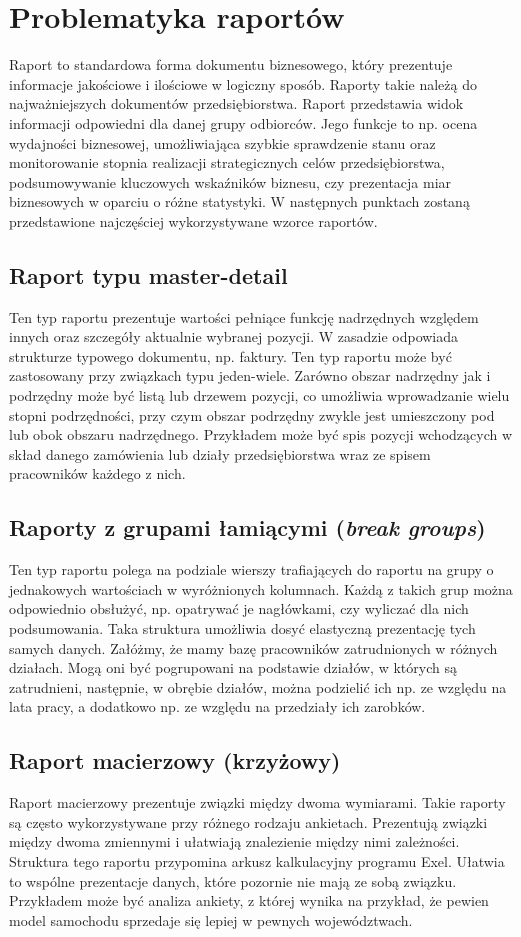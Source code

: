 \documentclass[11pt,a4paper]{article}
\begin{document}
\section{Problematyka raportów}\label{sec:raport}
Raport to standardowa forma dokumentu biznesowego, który prezentuje informacje jakościowe i ilościowe w logiczny sposób. Raporty takie należą do najważniejszych dokumentów przedsiębiorstwa. Raport przedstawia widok informacji odpowiedni dla danej grupy odbiorców. Jego funkcje to np.
ocena wydajności biznesowej, umożliwiająca szybkie sprawdzenie stanu oraz monitorowanie stopnia realizacji strategicznych celów przedsiębiorstwa, podsumowywanie kluczowych wskaźników biznesu, czy prezentacja miar biznesowych w oparciu o różne statystyki. W następnych punktach zostaną przedstawione najczęściej wykorzystywane wzorce raportów.
\subsection{Raport typu master-detail}\label{sec:master_detail}
Ten typ raportu prezentuje wartości pełniące funkcję nadrzędnych względem innych oraz szczegóły aktualnie wybranej pozycji. W zasadzie odpowiada strukturze typowego dokumentu, np. faktury. Ten typ raportu może być zastosowany przy związkach typu jeden-wiele. Zarówno obszar nadrzędny jak i podrzędny może być listą lub drzewem pozycji, co umożliwia wprowadzanie wielu stopni podrzędności, przy czym obszar podrzędny zwykle jest umieszczony pod lub obok obszaru nadrzędnego. Przykładem może być spis pozycji wchodzących w skład danego zamówienia lub działy przedsiębiorstwa wraz ze spisem pracowników każdego z nich.
\subsection{Raporty z grupami łamiącymi (\emph{break groups})}\label{sec:break_groups}
Ten typ raportu polega na podziale wierszy trafiających do raportu na grupy o jednakowych wartościach w wyróżnionych kolumnach. Każdą z takich grup można odpowiednio obsłużyć, np. opatrywać je nagłówkami, czy wyliczać dla nich podsumowania. Taka struktura umożliwia dosyć elastyczną prezentację tych samych danych. Załóżmy, że mamy bazę pracowników zatrudnionych w różnych działach. Mogą oni być pogrupowani na podstawie działów, w których są zatrudnieni, następnie, w obrębie działów, można podzielić ich np. ze względu na lata pracy, a dodatkowo np. ze względu na przedziały ich zarobków. 
\subsection{Raport macierzowy (krzyżowy)}\label{sec:macierzowy}
Raport macierzowy prezentuje związki między dwoma wymiarami. Takie raporty są często wykorzystywane przy różnego rodzaju ankietach. Prezentują związki między dwoma zmiennymi i ułatwiają znalezienie między nimi zależności. Struktura tego raportu przypomina arkusz kalkulacyjny programu Exel. Ułatwia to wspólne prezentacje danych, które pozornie nie mają ze sobą związku. Przykładem może być analiza ankiety, z której wynika na przykład, że pewien model samochodu sprzedaje się lepiej w pewnych województwach.
\end{document}
